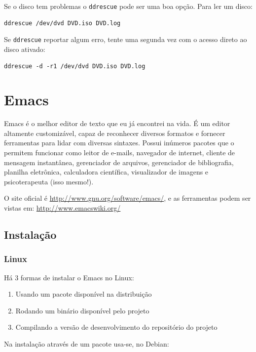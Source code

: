 \documentclass[12pt,brazil]{book}
\begin{document}
Se o disco tem problemas o \texttt{ddrescue} pode ser uma boa opção.
Para ler um disco:

\begin{verbatim}
ddrescue /dev/dvd DVD.iso DVD.log
\end{verbatim}

Se \texttt{ddrescue} reportar algum erro, tente uma segunda vez com o
acesso direto ao disco ativado:

\begin{verbatim}
ddrescue -d -r1 /dev/dvd DVD.iso DVD.log
\end{verbatim}

\chapter{Emacs}
\label{cha:emacs}

Emacs é o melhor editor de texto que eu já encontrei na vida. É um
editor altamente customizável, capaz de reconhecer diversos formatos e
fornecer ferramentas para lidar com diversas sintaxes. Possui inúmeros
pacotes que o permitem funcionar como leitor de e-mails, navegador de
internet, cliente de mensagem instantânea, gerenciador de arquivos,
gerenciador de bibliografia, planilha eletrônica, calculadora
científica, visualizador de imagens e psicoterapeuta (isso mesmo!).

O site oficial é \url{http://www.gnu.org/software/emacs/}, e as
ferramentas podem ser vistas em: \url{http://www.emacswiki.org/}

\section{Instalação}
\label{sec:instalacao-7}

\subsection{Linux}
\label{sec:linux}

Há 3 formas de instalar o Emacs no Linux:

\begin{enumerate}
\item Usando um pacote disponível na distribuição
\item Rodando um binário disponível pelo projeto
\item Compilando a versão de desenvolvimento do repositório do projeto
\end{enumerate}

Na instalação através de um pacote usa-se, no Debian:
\end{document}
